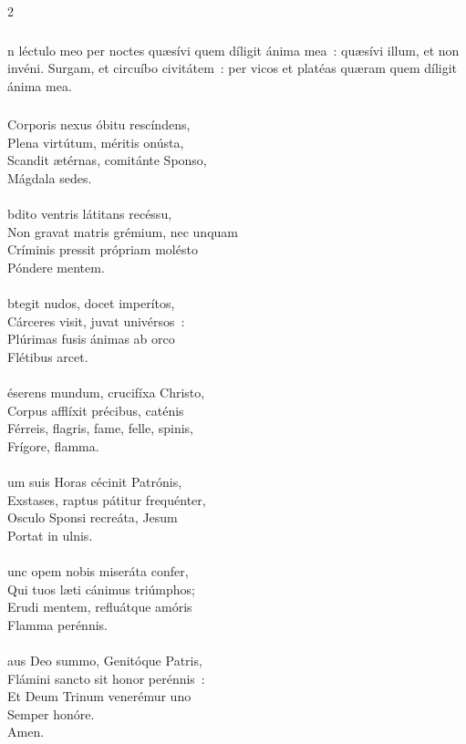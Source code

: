 \documentclass[9pt,twoside]{extarticle}
\begin{document}
\begin{multicols}{2}
{\subsubsection*{}
n léctulo meo per noctes quæsívi quem díligit ánima mea~: quæsívi illum, et non invéni. Surgam, et circuíbo civitátem~: per vicos et platéas quæram quem díligit ánima mea.

\subsubsection*{\center {}}
\lettrine{C}orporis nexus óbitu rescíndens,\\
Plena virtútum, méritis onústa,\\
Scandit ætérnas, comitánte Sponso,\\
Mágdala sedes.\\
\\
bdito ventris látitans recéssu,\\
Non gravat matris grémium, nec unquam\\
Críminis pressit própriam molésto\\
Póndere mentem.\\
\\
btegit nudos, docet imperítos,\\
Cárceres visit, juvat univérsos~:\\
Plúrimas fusis ánimas ab orco\\
Flétibus arcet.\\
\\
éserens mundum, crucifíxa Christo,\\
Corpus afflíxit précibus, caténis\\
Férreis, flagris, fame, felle, spinis,\\
Frígore, flamma.\\
\\
um suis Horas cécinit Patrónis,\\
Exstases, raptus pátitur frequénter,\\
Osculo Sponsi recreáta, Jesum\\
Portat in ulnis.\\
\\
unc opem nobis miseráta confer,\\
Qui tuos læti cánimus triúmphos;\\
Erudi mentem, refluátque amóris\\
Flamma perénnis.\\
\\
aus Deo summo, Genitóque Patris,\\
Flámini sancto sit honor perénnis~:\\
Et Deum Trinum venerémur uno\\
Semper honóre.\\
Amen.

}
\end{multicols}
\end{document}
